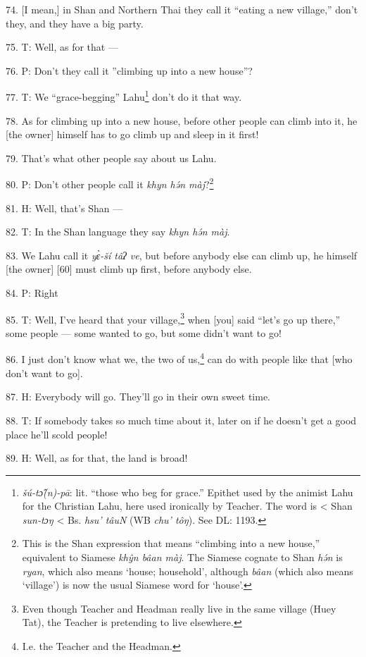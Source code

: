 74. [I mean,] in Shan and Northern Thai they call it ``eating a new village,''
don't they, and they have a big party.

75. T: Well, as for that ---

76. P: Don't they call it ''climbing up into a new house''?

77. T: We ``grace-begging'' Lahu\footnote{\textit{šú-tɔ̂(n)-pā}: lit. ``those who beg for grace.'' Epithet used by the animist Lahu for the Christian Lahu, here used ironically by Teacher. The word is < Shan \textit{sun-tɔŋ} < Bs. \textit{hsu' tâuN} (WB \textit{chu' tôŋ}). See DL: 1193.} don't do it that way.

78. As for climbing up into a new house, before other people can climb into it,
he [the owner] himself has to go climb up and sleep in it first!

79. That's what other people say about us Lahu.

80. P: Don't other people call it \textit{khyn hə́n màj}?\footnote{This is the Shan expression that means ``climbing into a new house,'' equivalent to Siamese \textit{khŷn bâan màj}. The Siamese cognate to Shan \textit{hə́n} is \textit{ryan}, which also means `house; household', although \textit{bâan} (which also means `village') is now the usual Siamese word for `house'.}

81. H: Well, that's Shan ---

82. T: In the Shan language they say \textit{khyn hə́n màj}.

83. We Lahu call it \textit{yɛ̀-ší tâʔ ve}, but before anybody else can climb
up, he himself [the owner] [60] must climb up first, before anybody else.

84. P: Right

85. T: Well, I've heard that your village,\footnote{Even though Teacher and Headman really live in the same village (Huey Tat), the Teacher is pretending to live elsewhere.} when [you] said ``let's go up there,''
some people --- some wanted to go, but some didn't want to go!

86. I just don't know what we, the two of us,\footnote{I.e. the Teacher and the Headman.} can do with people like that
[who don't want to go].

87. H: Everybody will go. They'll go in their own sweet time.

88. T: If somebody takes so much time about it, later on if he doesn't get a good
place he'll scold people!

89. H: Well, as for that, the land is broad!

